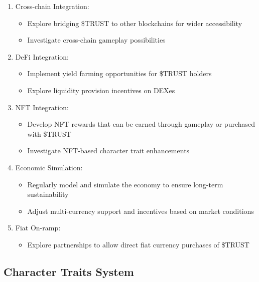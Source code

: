 \documentclass[]{article}
\begin{document}
\begin{enumerate}
\def\labelenumi{\arabic{enumi}.}
\tightlist
\item
  Cross-chain Integration:

  \begin{itemize}
  \tightlist
  \item
    Explore bridging \$TRUST to other blockchains for wider
    accessibility
  \item
    Investigate cross-chain gameplay possibilities
  \end{itemize}
\item
  DeFi Integration:

  \begin{itemize}
  \tightlist
  \item
    Implement yield farming opportunities for \$TRUST holders
  \item
    Explore liquidity provision incentives on DEXes
  \end{itemize}
\item
  NFT Integration:

  \begin{itemize}
  \tightlist
  \item
    Develop NFT rewards that can be earned through gameplay or purchased
    with \$TRUST
  \item
    Investigate NFT-based character trait enhancements
  \end{itemize}
\item
  Economic Simulation:

  \begin{itemize}
  \tightlist
  \item
    Regularly model and simulate the economy to ensure long-term
    sustainability
  \item
    Adjust multi-currency support and incentives based on market
    conditions
  \end{itemize}
\item
  Fiat On-ramp:

  \begin{itemize}
  \tightlist
  \item
    Explore partnerships to allow direct fiat currency purchases of
    \$TRUST
  \end{itemize}
\end{enumerate}

\hypertarget{character-traits-system}{%
\subsection{Character Traits System}\label{character-traits-system}}
\end{document}
